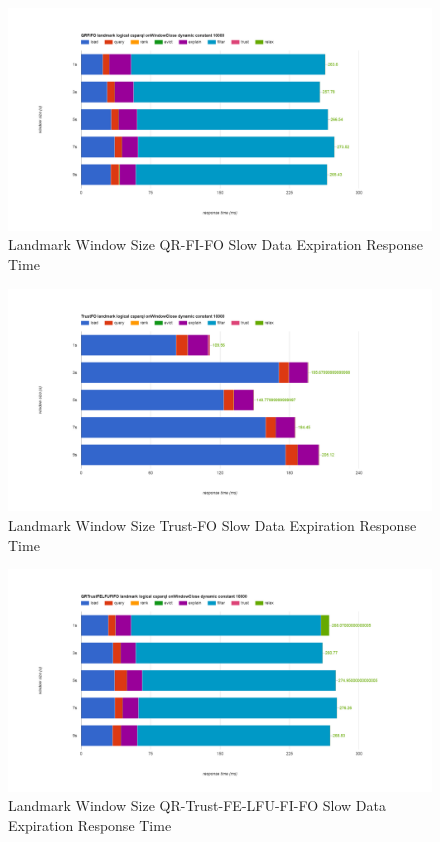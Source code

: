 \begin{figure}[!htbp]
    \centering
    \includegraphics[width=\textwidth]{img/app3-land-ws-qrfifo-slow-r.png}
    \caption{Landmark Window Size QR-FI-FO Slow Data Expiration Response Time}
\end{figure}
\begin{figure}[!htbp]
    \centering
    \includegraphics[width=\textwidth]{img/app3-land-ws-trustfo-slow-r.png}
    \caption{Landmark Window Size Trust-FO Slow Data Expiration Response Time}
\end{figure}
\begin{figure}[!htbp]
    \centering
    \includegraphics[width=\textwidth]{img/app3-land-ws-qrtrustfelfufifo-slow-r.png}
    \caption{Landmark Window Size QR-Trust-FE-LFU-FI-FO Slow Data Expiration Response Time}
\end{figure}

